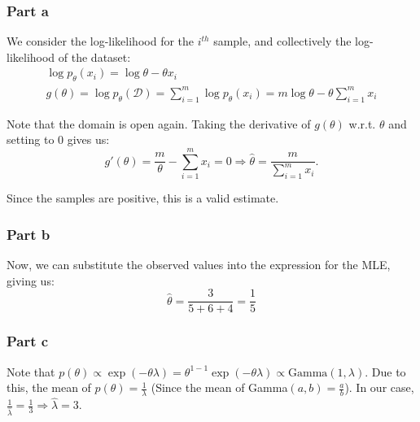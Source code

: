 \documentclass{article}
\begin{document}
\subsubsection*{Part a}
\begin{flushleft}
We consider the log-likelihood for the \(i^{th}\) sample, and collectively the log-likelihood of the dataset:
\begin{gather}
\log p_{\theta}(x_{i}) = \log \theta - \theta x_{i} \\
g(\theta) = \log p_{\theta}(\mathcal{D}) = \displaystyle \sum_{i=1}^{m} \log p_{\theta}(x_{i}) = m\log\theta - \theta \sum_{i=1}^{m} x_{i}
\end{gather}

Note that the domain is open again. Taking the derivative of \(g(\theta)\) w.r.t. \(\theta\) and setting to 0 gives us:
\begin{equation}
g'(\theta) = \frac{m}{\theta} - \sum_{i=1}^{m} x_{i} = 0 \Rightarrow \hat{\theta} = \frac{m}{\displaystyle \sum_{i=1}^{m} x_{i}}.
\end{equation}

Since the samples are positive, this is a valid estimate.
\end{flushleft}

\subsubsection*{Part b}
\begin{flushleft}
Now, we can substitute the observed values into the expression for the MLE, giving us:
\begin{equation}
\hat{\theta} = \frac{3}{5 + 6 + 4} = \frac{1}{5}
\end{equation}
\end{flushleft}

\subsubsection*{Part c}
\begin{flushleft}
Note that \(p(\theta) \propto \exp(-\theta \lambda) = \theta^{1 - 1}\exp(-\theta \lambda) \propto \text{Gamma}(1 , \lambda)\). Due to this, the mean of \(p(\theta) = \frac{1}{\lambda}\) (Since the mean of Gamma\((a, b) = \frac{a}{b}\)). In our case, \(\frac{1}{\hat{\lambda}} = \frac{1}{3} \Rightarrow \hat{\lambda} = 3\).
\end{flushleft}
\end{document}
